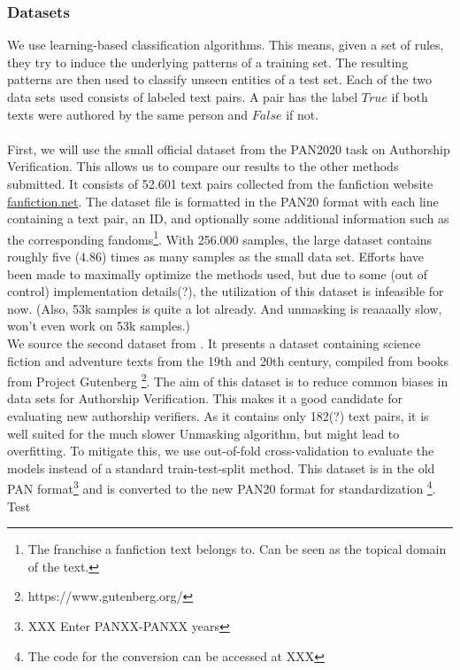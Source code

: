 \subsubsection{Datasets}
We use learning-based classification algorithms. This means, given a set of rules, they try to induce the underlying patterns of a training set. The resulting patterns are then used to classify unseen entities of a test set. Each of the two data sets used consists of labeled text pairs. A pair has the label $True$ if both texts were authored by the same person and $False$ if not.\\\\
First, we will use the small official dataset from the PAN2020 task on Authorship Verification. This allows us to compare our results to the other methods submitted. It consists of 52.601 text pairs collected from the fanfiction website \url{fanfiction.net}. The dataset file is formatted in the PAN20 format with each line containing a text pair, an ID, and optionally some additional information such as the corresponding fandoms\footnote{The franchise a fanfiction text belongs to. Can be seen as the topical domain of the text.}. With 256.000 samples, the large dataset contains roughly five (4.86) times as many samples as the small data set. Efforts have been made to maximally optimize the methods used, but due to some (out of control) implementation details(?), the utilization of this dataset is infeasible for now. (Also, 53k samples is quite a lot already. And unmasking is reaaaally slow, won't even work on 53k samples.)\\
We source the second dataset from \cite{stein2019unbiasedGutenbergCorpus}. It presents a dataset containing science fiction and adventure texts from the 19th and 20th century, compiled from books from Project Gutenberg \footnote{https://www.gutenberg.org/}. The aim of this dataset is to reduce common biases in data sets for Authorship Verification. This makes it a good candidate for evaluating new authorship verifiers. As it contains only 182(?) text pairs, it is well suited for the much slower Unmasking algorithm, but might lead to overfitting. To mitigate this, we use out-of-fold cross-validation to evaluate the models instead of a standard train-test-split method. This dataset is in the old PAN format\footnote{XXX Enter PANXX-PANXX years} and is converted to the new PAN20 format for standardization \footnote{The code for the conversion can be accessed at XXX}.\\
Test

